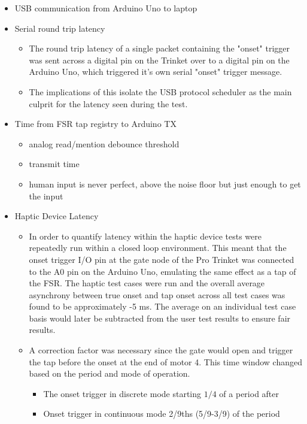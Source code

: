 \begin{itemize}
    \item USB communication from Arduino Uno to laptop
    \item Serial round trip latency
        \begin{itemize}
            \item The round trip latency of a single packet containing the "onset" trigger was sent across a digital pin on the Trinket over to a digital pin on the Arduino Uno, which triggered it's own serial "onset" trigger message.
            \item The implications of this isolate the USB protocol scheduler as the main culprit for the latency seen during the test.
        \end{itemize}
    \item Time from FSR tap registry to Arduino TX \label{FSRregistry}
    \begin{itemize}
        \item analog read/mention debounce threshold
        \item transmit time
        \item human input is never perfect, above the noise floor but just enough to get the input
    \end{itemize}
    \item Haptic Device Latency
    \begin{itemize}
        \item In order to quantify latency within the haptic device tests were repeatedly run within a closed loop environment. This meant that the onset trigger I/O pin at the gate node of the Pro Trinket was connected to the A0 pin on the Arduino Uno, emulating the same effect as a tap of the FSR. The haptic test cases were run and the overall average asynchrony between true onset and tap onset across all test cases was found to be approximately -5 ms. The average on an individual test case basis would later be subtracted from the user test results to ensure fair results.
        \item A correction factor was necessary since the gate would open and trigger the tap before the onset at the end of motor 4. This time window changed based on the period and mode of operation.
        \begin{itemize}
            \item The onset trigger in discrete mode starting $1/4$ of a period after
            \item Onset trigger in continuous mode 2/9ths (5/9-3/9) of the period
        \end{itemize}

\end{itemize}
\end{itemize}
